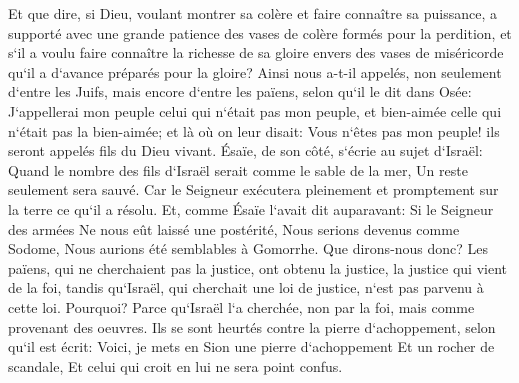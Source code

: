 \verse Et que dire, si Dieu, voulant montrer sa colère et faire connaître sa puissance, a supporté avec une grande patience des vases de colère formés pour la perdition, 
\verse et s`il a voulu faire connaître la richesse de sa gloire envers des vases de miséricorde qu`il a d`avance préparés pour la gloire? 
\verse Ainsi nous a-t-il appelés, non seulement d`entre les Juifs, mais encore d`entre les païens, 
\verse selon qu`il le dit dans Osée: J`appellerai mon peuple celui qui n`était pas mon peuple, et bien-aimée celle qui n`était pas la bien-aimée; 
\verse et là où on leur disait: Vous n`êtes pas mon peuple! ils seront appelés fils du Dieu vivant. 
\verse Ésaïe, de son côté, s`écrie au sujet d`Israël: Quand le nombre des fils d`Israël serait comme le sable de la mer, Un reste seulement sera sauvé. 
\verse Car le Seigneur exécutera pleinement et promptement sur la terre ce qu`il a résolu. 
\verse Et, comme Ésaïe l`avait dit auparavant: Si le Seigneur des armées Ne nous eût laissé une postérité, Nous serions devenus comme Sodome, Nous aurions été semblables à Gomorrhe. 
\verse Que dirons-nous donc? Les païens, qui ne cherchaient pas la justice, ont obtenu la justice, la justice qui vient de la foi, 
\verse tandis qu`Israël, qui cherchait une loi de justice, n`est pas parvenu à cette loi. 
\verse Pourquoi? Parce qu`Israël l`a cherchée, non par la foi, mais comme provenant des oeuvres. Ils se sont heurtés contre la pierre d`achoppement, 
\verse selon qu`il est écrit: Voici, je mets en Sion une pierre d`achoppement Et un rocher de scandale, Et celui qui croit en lui ne sera point confus. 

